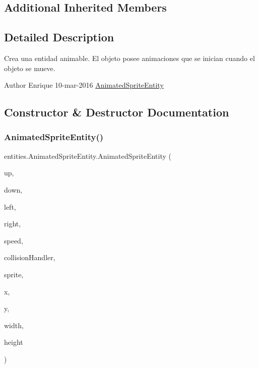 \subsection*{Additional Inherited Members}


\subsection{Detailed Description}
Crea una entidad animable. El objeto posee animaciones que se inician cuando el objeto se mueve.

\begin{DoxyAuthor}{Author}
Enrique  10-\/mar-\/2016  \mbox{\hyperlink{classentities_1_1_animated_sprite_entity}{Animated\+Sprite\+Entity}} 
\end{DoxyAuthor}


\subsection{Constructor \& Destructor Documentation}
\mbox{\label{classentities_1_1_animated_sprite_entity_a145d1fa32489f091a9619ab78bb8bdbf}} 
\subsubsection{\texorpdfstring{Animated\+Sprite\+Entity()}{AnimatedSpriteEntity()}\hspace{0.1cm}{\footnotesize\ttfamily [1/2]}}
{\footnotesize\ttfamily entities.\+Animated\+Sprite\+Entity.\+Animated\+Sprite\+Entity (\begin{DoxyParamCaption}\item[{\mbox{\hyperlink{classorg_1_1newdawn_1_1slick_1_1_animation}{Animation}}}]{up,  }\item[{\mbox{\hyperlink{classorg_1_1newdawn_1_1slick_1_1_animation}{Animation}}}]{down,  }\item[{\mbox{\hyperlink{classorg_1_1newdawn_1_1slick_1_1_animation}{Animation}}}]{left,  }\item[{\mbox{\hyperlink{classorg_1_1newdawn_1_1slick_1_1_animation}{Animation}}}]{right,  }\item[{float}]{speed,  }\item[{\mbox{\hyperlink{classentities_1_1_collision_handler}{Collision\+Handler}}}]{collision\+Handler,  }\item[{\mbox{\hyperlink{classorg_1_1newdawn_1_1slick_1_1_image}{Image}}}]{sprite,  }\item[{float}]{x,  }\item[{float}]{y,  }\item[{float}]{width,  }\item[{float}]{height }\end{DoxyParamCaption})\hspace{0.3cm}{\ttfamily [inline]}}

